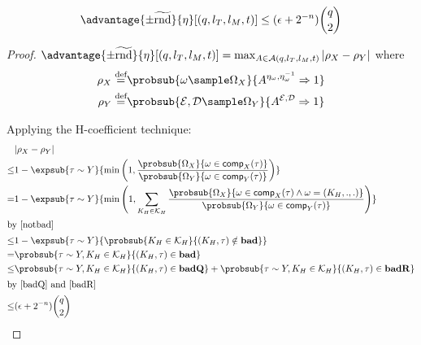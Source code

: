 \documentclass[eprint.tex]{subfiles}
\begin{document}
\begin{lemma} \label{xyadv}
    \begin{displaymath}
        \advantage{\pm \widetilde{\mathrm{rnd}}}{\eta}[(q, l_T, l_M, t)]
        \leq (\epsilon + 2^{-n})\binom{q}{2}
    \end{displaymath}
\end{lemma}

\begin{proof}
    $\advantage{\pm \widetilde{\mathrm{rnd}}}{\eta}[(q, l_T, l_M, t)]
    = \max_{A \in \mathcal{A}(q, l_T, l_M, t)} |\rho_X - \rho_Y|$ where
    \begin{align*}
        \rho_X \defeq& \probsub{\omega \sample \Omega_X}{A^{\eta_{\omega}, \eta_{\omega}^{-1}}\Rightarrow 1} \\
        \rho_Y \defeq& \probsub{\mathcal{E}, \mathcal{D} \sample \Omega_Y}{A^{\mathcal{E}, \mathcal{D}}\Rightarrow 1} \\
    \end{align*}

    Applying the H-coefficient technique:
    \begin{align*}
        &|\rho_X - \rho_Y| \\
        \leq& 1 - \expsub{\tau \sim Y}{\min
            \left(1,
               \frac{\probsub{\Omega_X}{\omega \in \comp_X(\tau)}}
               {\probsub{\Omega_Y}{\omega \in \comp_Y(\tau)}}
            \right)} \\
        =& 1 - \expsub{\tau \sim Y}{\min
            \left(1, \sum_{K_H \in \mathcal{K}_H}
              \frac{\probsub{\Omega_X}{\omega \in \comp_X(\tau) \wedge \omega = (K_H, ., .)}}
              {\probsub{\Omega_Y}{\omega \in \comp_Y(\tau)}}
            \right)} \\
        \intertext{by \autoref{notbad}}
        \leq& 1 - \expsub{\tau \sim Y}{
            \probsub{K_H \in \mathcal{K}_H}{(K_H, \tau) \notin \bad}} \\
        = & \probsub{\tau \sim Y, K_H \in \mathcal{K}_H}{(K_H, \tau) \in \bad} \\
        \leq & \probsub{\tau \sim Y, K_H \in \mathcal{K}_H}{(K_H, \tau) \in \badQ}
         + \probsub{\tau \sim Y, K_H \in \mathcal{K}_H}{(K_H, \tau) \in \badR} \\
         \intertext{by \autoref{badQ} and \autoref{badR}}
        \leq & (\epsilon + 2^{-n})\binom{q}{2} \\
    \end{align*}
\end{proof}
\end{document}
